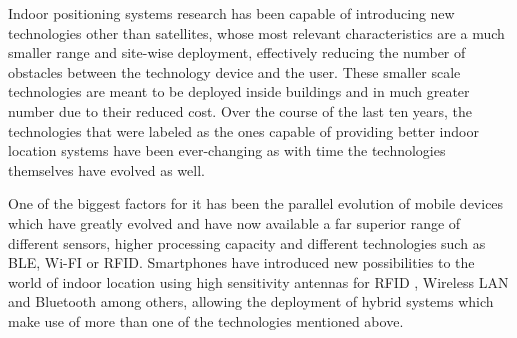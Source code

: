  
Indoor positioning systems research has been capable of introducing new technologies other than satellites, whose most relevant characteristics are a much smaller range and site-wise deployment, effectively reducing the number of obstacles between the technology device and the user. These smaller scale technologies are meant to be deployed inside buildings and in much greater number due to their reduced cost. Over the course of the last ten years, the technologies that were labeled as the ones capable of providing better indoor location systems have been ever-changing as with time the technologies themselves have evolved as well.  
 
 
One of the biggest factors for it has been the parallel evolution of mobile devices which have greatly evolved and have now available a far superior range of different sensors, higher processing capacity and different technologies such as \ac{BLE}, Wi-FI or \ac{RFID}. Smartphones have introduced new possibilities to the world of indoor location using high sensitivity antennas for \ac{RFID} , Wireless \ac{LAN} and Bluetooth among others, allowing the deployment of hybrid systems which make use of more than one of the technologies mentioned above\cite{surveythesis,survey2,survey1}. 
 
 
 
 
 
 
 
\cleardoublepage 
 